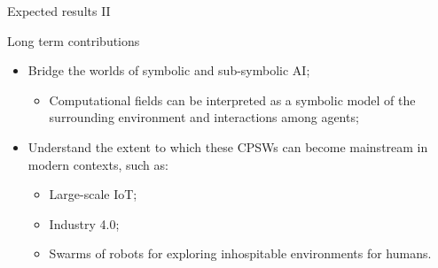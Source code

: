 \documentclass[presentation]{beamer}\mode<presentation>{\usetheme{AMSBolognaFC}}
\begin{document}
\begin{frame}[c]{Expected results II}

\begin{alertblock}{Long term contributions}
	\begin{itemize}
		\item Bridge the worlds of symbolic and sub-symbolic AI;
		\begin{itemize}
			\item Computational fields can be interpreted as a symbolic model 
				of the surrounding environment and interactions among agents;
		\end{itemize}
		\item Understand the extent to which these CPSWs can 
			become mainstream in modern contexts, such as:
		\begin{itemize}
			\item Large-scale IoT;
			\item Industry 4.0;
			\item Swarms of robots for exploring inhospitable environments for humans.
		\end{itemize}
	\end{itemize}
\end{alertblock}

\end{frame}

\section*{}

\frame{\titlepage}

\section*{\refname}

\begin{frame}{\refname}
	\tiny
	\nocite{*}
	\printbibliography
\end{frame}

\end{document}
